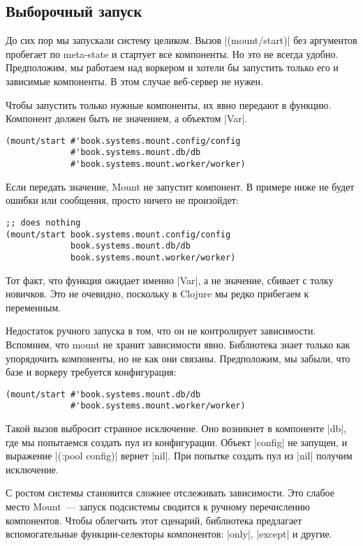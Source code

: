 \subsection{Выборочный запуск}

До сих пор мы запускали систему целиком. Вызов \spverb|(mount/start)| без аргументов
пробегает по meta-state и стартует все компоненты. Но это не всегда
удобно. Предположим, мы работаем над воркером и хотели бы запустить только его и
зависимые компоненты. В этом случае веб-сервер не нужен.

Чтобы запустить только нужные компоненты, их явно передают в функцию. Компонент
должен быть не значением, а объектом \spverb|Var|.

\begin{verbatim}
(mount/start #'book.systems.mount.config/config
             #'book.systems.mount.db/db
             #'book.systems.mount.worker/worker)
\end{verbatim}

Если передать значение, Mount не запустит компонент. В примере ниже не будет
ошибки или сообщения, просто ничего не произойдет:

\begin{verbatim}
;; does nothing
(mount/start book.systems.mount.config/config
             book.systems.mount.db/db
             book.systems.mount.worker/worker)
\end{verbatim}

Тот факт, что функция ожидает именно \spverb|Var|, а не значение, сбивает с толку
новичков. Это не очевидно, поскольку в Clojure мы редко прибегаем к переменным.

Недостаток ручного запуска в том, что он не контролирует зависимости. Вспомним,
что mount не хранит зависимости явно. Библиотека знает только как упорядочить
компоненты, но не как они связаны. Предположим, мы забыли, что базе и воркеру
требуется конфигурация:

\begin{verbatim}
(mount/start #'book.systems.mount.db/db
             #'book.systems.mount.worker/worker)
\end{verbatim}

Такой вызов выбросит странное исключение. Оно возникнет в компоненте \spverb|db|, где
мы попытаемся создать пул из конфигурации. Объект \spverb|config| не запущен, и
выражение \spverb|(:pool config)| вернет \spverb|nil|. При попытке создать пул из \spverb|nil|
получим исключение.

С ростом системы становится сложнее отслеживать зависимости. Это слабое место
Mount~--- запуск подсистемы сводится к ручному перечислению компонентов. Чтобы
облегчить этот сценарий, библиотека предлагает вспомогательные функции-селекторы
компонентов: \spverb|only|, \spverb|except| и другие.

